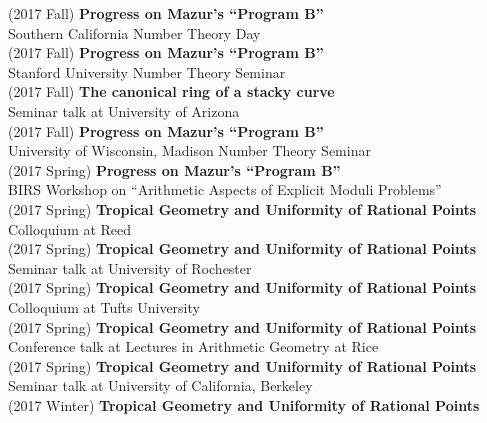 \documentclass[margin,line]{res}
\begin{document}
\begin{resume}
(2017 Fall) \textbf{Progress on Mazur's ``Program B''}\\  
Southern California Number Theory Day
\vspace{.05cm}\\
(2017 Fall) \textbf{Progress on Mazur's ``Program B''}\\  
Stanford University Number Theory Seminar
\vspace{.05cm}\\
(2017 Fall) \textbf{The canonical ring of a stacky curve}\\  
Seminar talk at University of Arizona
\vspace{.05cm}\\
(2017 Fall) \textbf{Progress on Mazur's ``Program B''}\\  
University of Wisconsin, Madison Number Theory Seminar
\vspace{.05cm}\\
(2017 Spring) \textbf{Progress on Mazur's ``Program B''}\\  
BIRS Workshop on ``Arithmetic Aspects of Explicit Moduli Problems''
\vspace{.05cm}\\
(2017 Spring) \textbf{Tropical Geometry and Uniformity of Rational Points}\\
Colloquium at Reed 
\vspace{.05cm}\\
(2017 Spring) \textbf{Tropical Geometry and Uniformity of Rational Points}\\
Seminar talk at University of Rochester
\vspace{.05cm}\\
(2017 Spring) \textbf{Tropical Geometry and Uniformity of Rational Points}\\
Colloquium at Tufts University 
\vspace{.05cm}\\
(2017 Spring) \textbf{Tropical Geometry and Uniformity of Rational Points}\\
Conference talk at Lectures in Arithmetic Geometry at Rice
\vspace{.05cm}\\
(2017 Spring) \textbf{Tropical Geometry and Uniformity of Rational Points}\\
Seminar talk at University of California, Berkeley
\vspace{.05cm}\\
(2017 Winter) \textbf{Tropical Geometry and Uniformity of Rational Points}\\

\end{resume}
\end{document}
